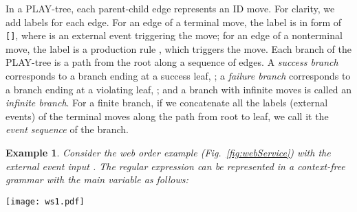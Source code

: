 \documentclass[]{llncs}
\newtheorem{Ex}{Example}
\begin{document}
\iffalse
\begin{definition}[PLAY-tree]
Let  be a system model,  its LSC specification
and  a context-free grammar. Then the {\em PLAY-tree}
for  is defined as follows:
\begin{enumerate}
  \item Each node of the tree is an ID.
  \item The {\em root} node is ,
where  is a set of initial system object states,  is the start variable
    in the CFG , and the empty set  means no running LSCs at the initial state.
  \item Let  be a node in the tree. This node has an edge to
    a child    for each possible move
    .
\item The following nodes have no children:
    , denoted as a {\em violating leaf} node,
    and , denoted as a {\em success leaf} node.
\end{enumerate}
\label{def:play-tree}
\end{definition}
\fi


In a PLAY-tree, each parent-child edge represents an ID move. For clarity, we
add labels for each edge. For an edge of a terminal move, the label
is in form of {\tt []}, where  is an external event triggering
the move; for an edge of a nonterminal move, the label is a production
rule , which triggers the move.
Each branch of the PLAY-tree is a path from the root along a sequence of
edges. A {\em success branch} corresponds to a branch ending at a success leaf, ;
a {\em failure branch} corresponds to a branch ending at a violating leaf, ;
and a branch with infinite moves is called an {\em infinite branch}.
For a finite branch, if we concatenate all the labels (external events)
of the terminal moves along the path from root to leaf, we call it
the {\em event sequence} of the branch.

\begin{Ex}
  Consider the web order example (Fig.~\ref{fig:webService}) with the
  external event input .
  The regular expression can be represented in a context-free grammar  with the main variable  as follows:
  
\label{ex:webService1}
\end{Ex}


\begin{figure*}[htb]
	\centering
\texttt{[image: ws1.pdf]}\\
\caption{A PLAY-tree for the web order system in Example~\ref{ex:webService1}}
\label{fig:ws1}
\end{figure*}
\end{document}
